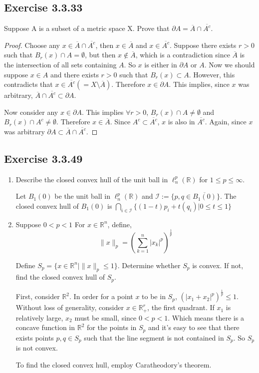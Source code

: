 \documentclass{tufte-book}
\theoremstyle{mytheoremstyle}
\theoremstyle{mylemstyle}
\theoremstyle{mydefstyle}
\begin{document}
\subsection{Exercise 3.3.33}
Suppose A is a subset of a metric space X.  Prove that $\partial A = \overline{A} \cap \overline{A^c}$.

\begin{proof}
Choose any $x \in \overline{A} \cap \overline{A^c}$, then $x \in \overline{A}$ and $x \in \overline{A^c}$. Suppose there exists $r>0$ such that $B_r(x) \cap A = \emptyset$, but then $x \notin \overline{A}$, which is a contradiction since $\overline{A}$ is the intersection of all sets containing $A$.  So $x$ is either in $\partial{A}$ or $A$.  Now we should suppose $x \in A$ and there exists $r > 0$ such that $B_r(x) \subset A$.  However, this contradicts that $x \in \overline{A^c}(= X \setminus \overline{A})$.  Therefore $x \in \partial A$.  This implies, since $x$ was arbitrary, $\overline{A} \cap \overline{A^c} \subset \partial A$.

Now consider any $x \in \partial A$. This implies $\forall r>0$, $B_r(x) \cap A \neq \emptyset$ and $B_r(x) \cap A^c \neq \emptyset$.  Therefore $x \in \overline{A}$.  Since $A^c \subset \overline{A^c}$, $x$ is also in $\overline{A^c}$.  Again, since $x$ was arbitrary $\partial A \subset \overline{A} \cap \overline{A^c}$.

\end{proof}


\subsection{Exercise 3.3.49}
\begin{enumerate}
\item Describe the closed convex hull of the unit ball in $\ell_n^p(\mathbb{R})$ for $1 \leq p \leq \infty$.

Let $B_1(0)$ be the unit ball in $\ell_n^p(\mathbb{R})$ and $\mathcal{I} := \{p,q \in \overline{B_1(0)} \}$.  The closed convex hull of $B_1(0)$ is $\bigcap_{i \in \mathcal{I}} \{(1-t)p_i + t(q_i) | 0 \leq t \leq 1 \}$ 

\item Suppose $0 < p < 1$ For $x \in \mathbb{R}^n$, define,
\[ \|x\|_p = \left( \sum_{k=1}^n |x_k|^p \right)^\frac{1}{p} \]

Define $S_p = \{x \in \mathbb{R}^n | \|x\|_p \leq 1 \}$.  Determine whether $S_p$ is convex.  If not, find the closed convex hull of $S_p$.

First, consider $\mathbb{R}^2$.  In order for a point $x$ to be in $S_p$, $(|x_1 + x_2|^p)^\frac{1}{p} \leq 1$.  Without loss of generality, consider $x \in \mathbb{R}_+^r$, the first quadrant.  If $x_1$ is relatively large, $x_2$ must be small, since $0<p<1$.  Which means there is a concave function in $\mathbb{R}^2$ for the points in $S_p$ and it's easy to see that there exists points $p,q \in S_p$ such that the line segment is not contained in $S_p$. So $S_p$ is not convex.

To find the closed convex hull, employ Caratheodory's theorem.
\end{enumerate}
\end{document}
